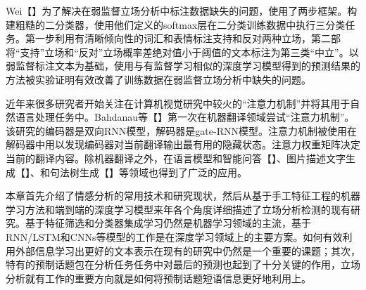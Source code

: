 Wei【】为了解决在弱监督立场分析中标注数据缺失的问题，使用了两步框架。构建粗糙的二分类器，使用他们定义的softmax层在二分类训练数据中执行三分类任务。第一步利用有清晰倾向性的词汇和表情标注支持和反对两种立场，第二部将“支持”立场和“反对”立场概率差绝对值小于阈值的文本标注为第三类“中立”。以弱监督标注文本为基础，使用与有监督学习相似的深度学习模型得到的预测结果的方法被实验证明有效改善了训练数据在弱监督立场分析中缺失的问题。

近年来很多研究者开始关注在计算机视觉研究中较火的“注意力机制”并将其用于自然语言处理任务中。Bahdanau等【】第一次在机器翻译领域尝试“注意力机制”。该研究的编码器是双向RNN模型，解码器是gate-RNN模型。注意力机制被使用在解码器中用以发现编码器对当前翻译输出最有用的隐藏状态。注意力权重矩阵决定当前的翻译内容。除机器翻译之外，在语言模型和智能问答【】、图片描述文字生成【】、和句法树生成【】等领域也得到了广泛的应用。




本章首先介绍了情感分析的常用技术和研究现状，然后从基于手工特征工程的机器学习方法和端到端的深度学习模型来年各个角度详细描述了立场分析检测的现有研究。基于特征筛选和分类器集成学习仍然是机器学习领域的主流，基于RNN/LSTM和CNNs等模型的工作是在深度学习领域上的主要方案。如何有效利用外部信息学习出更好的文本表示在现有的研究中仍然是一个重要的课题；其次，特有的预制话题包在分析任务任务中对最后的预测也起到了十分关键的作用，立场分析就有工作的重要方向就是如何将预制话题短语信息更好地利用上。